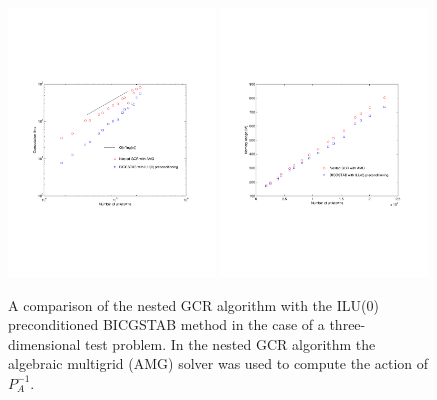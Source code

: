 \begin{versiona}
\begin{figure}[h]
  \vspace{-3cm}
  \begin{center}
    \includegraphics[width=0.49\textwidth]{comptime.pdf}
    \includegraphics[width=0.49\textwidth]{memory.pdf}
   \end{center}
  \vspace{-3cm}
\caption{A comparison of the nested GCR algorithm with the ILU(0) preconditioned
BICGSTAB method in the case of a three-dimensional test problem. 
In the nested GCR algorithm the algebraic multigrid (AMG) solver was used to 
compute the action of $P_A^{-1}$.}
\end{figure}




\end{versiona}
